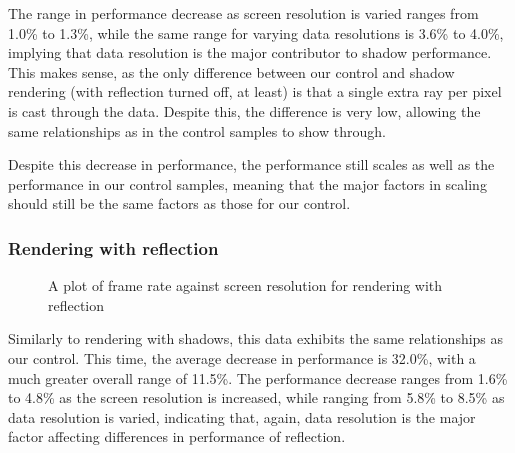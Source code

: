 The range in performance decrease as screen resolution is varied ranges from 1.0\% to 1.3\%, while the same range for varying data resolutions is 3.6\% to 4.0\%, implying that data resolution is the major contributor to shadow performance. This makes sense, as the only difference between our control and shadow rendering (with reflection turned off, at least) is that a single extra ray per pixel is cast through the data. Despite this, the difference is very low, allowing the same relationships as in the control samples to show through.

Despite this decrease in performance, the performance still scales as well as the performance in our control samples, meaning that the major factors in scaling should still be the same factors as those for our control.

\subsubsection{Rendering with reflection}
\begin{figure}[H]
\centering
{}

\caption{A plot of frame rate against screen resolution for rendering with reflection}
\end{figure}

Similarly to rendering with shadows, this data exhibits the same relationships as our control. This time, the average decrease in performance is 32.0\%, with a much greater overall range of 11.5\%. The performance decrease ranges from 1.6\% to 4.8\% as the screen resolution is increased, while ranging from 5.8\% to 8.5\% as data resolution is varied, indicating that, again, data resolution is the major factor affecting differences in performance of reflection.

